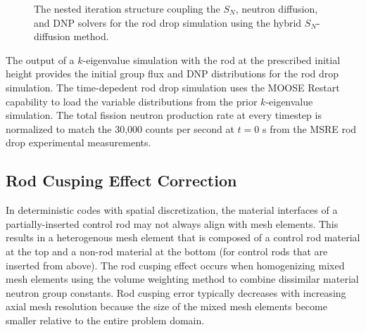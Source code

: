 \begin{figure}[htb!]
  \centering
  \caption{The nested iteration structure coupling the $S_N$, neutron diffusion, and \gls{DNP}
  solvers for the rod drop simulation using the hybrid $S_N$-diffusion method.}
  \label{fig:rod-drop-coupling}
\end{figure}

The output of a $k$-eigenvalue simulation with the rod at the prescribed initial height provides
the initial group flux and \gls{DNP} distributions for the rod drop simulation. The time-depedent
rod drop simulation uses the \gls{MOOSE} Restart capability to load the variable distributions from
the prior $k$-eigenvalue simulation. The total fission neutron production rate at every timestep
is normalized to match the 30,000 counts per second at $t=0$ s from the \gls{MSRE} rod drop
experimental measurements.

\subsection{Rod Cusping Effect Correction}

In deterministic codes with spatial discretization, the material interfaces of a partially-inserted
control rod may not always align with mesh elements. This results in a heterogenous
mesh element that is composed of a control rod material at the top and a non-rod material at the
bottom (for control rods that are inserted from above). The rod cusping effect occurs when
homogenizing mixed mesh elements using the volume weighting method to combine dissimilar material
neutron group constants. Rod cusping error typically decreases with increasing axial mesh
resolution because the size of the mixed mesh elements become smaller relative to the entire
problem domain.

